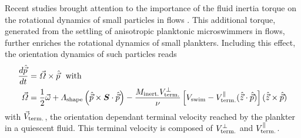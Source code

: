 Recent studies brought attention to the importance of the fluid inertia torque on the rotational dynamics of small particles in flows \citep{gustavsson2019effect, sheikh2020importance, anand2020orientation, qiu2022gyrotactic}.
This additional torque, generated from the settling of anisotropic planktonic microswimmers in flows, further enriches the rotational dynamics of small plankters.
Including this effect, the orientation dynamics of such particles reads
\begin{subequations}
	\begin{align}
		\frac{d \hat{\vec{p}}}{dt} &= \vec{\varOmega} \times \hat{\vec{p}} ~~ \text{with}\\
		\vec{\varOmega} &= \frac{1}{2} \vec{\omega} + \varLambda_{\mathrm{shape}} \left( \hat{\vec{p}} \times \boldsymbol{S} \cdot \hat{\vec{p}} \right) - \frac{M_{\mathrm{inert.}} V_{\mathrm{term.}}^\perp}{\nu} \left[ V_{\mathrm{swim}} - V_{\mathrm{term.}}^\parallel (\hat{\vec{z}} \cdot \hat{\vec{p}}) \right] (\hat{\vec{z}} \times \hat{\vec{p}})\label{eq:fluid_inertia_torque}
	\end{align}
\end{subequations}
with $\vec{V}_{\mathrm{term.}}$, the orientation dependant terminal velocity reached by the plankter in a quiescent fluid. 
This terminal velocity is composed of $V_{\mathrm{term.}}^\perp$ and $V_{\mathrm{term.}}^\parallel$.
